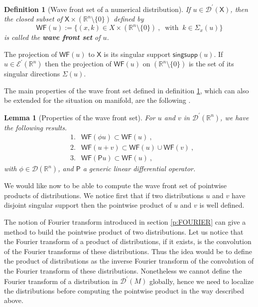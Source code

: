 \documentclass[11pt]{book}
\newcommand{\WF}{\mathsf{WF}}
\newcommand{\Dcal}{\mathcal{D}}
\newcommand{\Ecal}{\mathcal{E}}
\newcommand{\Rbb}{\mathbb{R}}
\newcommand{\Psf}{\mathsf{P}}
\newcommand{\Xsf}{\mathsf{X}}
\theoremstyle{break}
\newtheorem{lemma}{Lemma}[chapter]
\newtheorem{definition}{Definition}[chapter]
\begin{document}
\begin{definition}[Wave front set of a numerical distribution]\label{def:wf}
If $u \in \Dcal^\prime(\Xsf)$, then the closed subset of $\Xsf \times (\Rbb^n \setminus \{0\})$ defined by
%
\begin{equation*}
\WF(u) := \bigg\{ (x,k) \in X \times (\Rbb^n \setminus \{0\}) \ , \ \mbox{ with } \ k \in \Sigma_x(u) \bigg\}
\end{equation*}
%
is called the \textbf{wave front set} of $u$.  
\end{definition}


The projection of $\WF(u)$ to $\Xsf$ is its singular support $\mathsf{singsupp}(u)$. If $u \in \Ecal^\prime(\Rbb^n)$ then the projection of $\WF(u)$ on $(\Rbb^n \setminus \{0\})$ is the set of its singular directions $\Sigma(u)$. 


The main properties of the wave front set defined in definition \ref{def:wf}, which can also be extended for the situation on manifold, are the following \cite{hormander_analysis_1990}.


\begin{lemma}[Properties of the wave front set]\label{lem:prop_wf}
For $u$ and $v$ in $\Dcal^\prime(\Rbb^n)$, we have the following results.
%
\begin{eqnarray*}
&1.& \WF(\phi u) \subset \WF(u) \ , \\
&2.& \WF(u+v) \subset \WF(u) \cup \WF(v) \ , \\ 
&3.& \WF(\Psf u) \subset \WF(u) \ , 
\end{eqnarray*}
%
with $\phi\in\Dcal(\Rbb^n)$, and $\Psf$ a generic linear differential operator. 
\end{lemma}


\bigskip


We would like now to be able to compute the wave front set of pointwise products of distributions. We notice first that if two distributions $u$ and $v$ have disjoint singular support then the pointwise product of $u$ and $v$ is well defined.


\bigskip


The notion of Fourier transform introduced in section \ref{p:FOURIER} can give a method to build the pointwise product of two distributions. Let us notice that the Fourier transform of a product of distributions, if it exists, is the convolution of the Fourier transforms of these distributions. Thus the idea would be to define the product of distributions as the inverse Fourier transform of the convolution of the Fourier transform of these distributions. Nonetheless we cannot define the Fourier transform of a distribution in $\Dcal^\prime(M)$ globally, hence we need to localize the distributions before computing the pointwise product in the way described above. 
\end{document}
